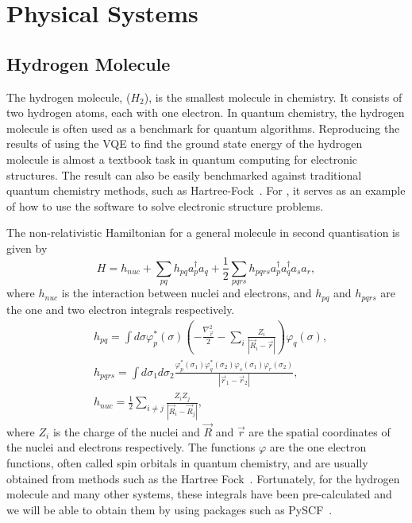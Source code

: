 \chapter{Physical Systems}
\label{chap:physical_systems}

\section{Hydrogen Molecule}
\label{sec:hydrogen_molecule}
The hydrogen molecule, ($ H_2 $), is the smallest molecule in chemistry. It consists of two hydrogen atoms, each with one electron. In quantum chemistry, the hydrogen molecule is often used as a benchmark for quantum algorithms. Reproducing the results of using the VQE to find the ground state energy of the hydrogen molecule is almost a textbook task in quantum computing for electronic structures. The result can also be easily benchmarked against traditional quantum chemistry methods, such as Hartree-Fock~\cite{Coleman2015}. For \quanthon, it serves as an example of how to use the software to solve electronic structure problems. 

The non-relativistic Hamiltonian for a general molecule in second quantisation is given by
\begin{equation}
	\label{eq:hamiltonian}
	H = h_{nuc} + \sum_{pq} h_{pq} a_p^\dagger a_q + \frac{1}{2} \sum_{pqrs} h_{pqrs} a_p^\dagger a_q^\dagger a_s a_r,
\end{equation}
where $ h_{nuc} $ is the interaction between nuclei and electrons, and $ h_{pq} $ and $ h_{pqrs} $ are the one and two electron integrals respectively. 
\begin{equation}
	\label{eq:elctron_integrals}
\begin{aligned}
& h_{p q}=\int d \sigma \varphi_p^*(\sigma)\left(-\frac{\nabla_{\vec{r}}^2}{2}-\sum_i \frac{Z_i}{\left|\vec{R}_i-\vec{r}\right|}\right) \varphi_q(\sigma), \\
& h_{p q r s}=\int d \sigma_1 d \sigma_2 \frac{\varphi_p^*\left(\sigma_1\right) \varphi_q^*\left(\sigma_2\right) \varphi_s\left(\sigma_1\right) \varphi_r\left(\sigma_2\right)}{\left|\vec{r}_1-\vec{r}_2\right|}, \\
& h_{n u c}=\frac{1}{2} \sum_{i \neq j} \frac{Z_i Z_j}{\left|\vec{R}_i-\vec{R}_j\right|},
\end{aligned}
\end{equation}
where $ Z_i $ is the charge of the nuclei and $ \vec{R} $ and  $\vec{r} $ are the spatial coordinates of the nuclei and electrons respectively. The functions $ \varphi $ are the one electron functions, often called spin orbitals in quantum chemistry, and are usually obtained from methods such as the Hartree Fock~\cite{Romero2019}. Fortunately, for the hydrogen molecule and many other systems, these integrals have been pre-calculated and we will be able to obtain them by using packages such as PySCF~\cite{sun2018}.

